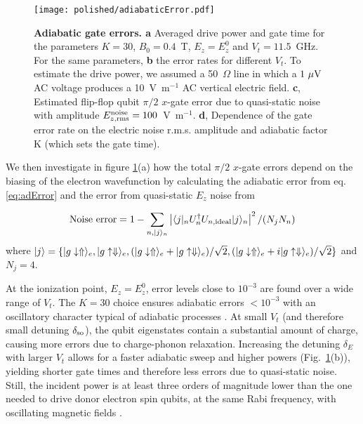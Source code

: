\begin{figure}[h]
	\centering
	\texttt{[image: polished/adiabaticError.pdf]}
	\caption[Adiabatic gate errors]{\textbf{Adiabatic gate errors. a} Averaged drive power and gate time for the parameters $K=30$, $B_0=0.4$~T, $E_z=E_z^0$ and $V_t=11.5$~GHz. For the same parameters, \textbf{b} the error rates for different $V_t$. To estimate the drive power, we assumed a 50~$\Omega$ line in which a $1~{\rm \mu V}$ AC voltage produces a 10~V~m$^{-1}$ AC vertical electric field.
		\textbf{c}, Estimated flip-flop qubit $\pi/2$ $x$-gate error due to quasi-static noise with amplitude $E_{z, \rm rms}^{\rm noise}=100$~V~m$^{-1}$.
		\textbf{d}, Dependence of the gate error rate on the electric noise r.m.s. amplitude and adiabatic factor K (which sets the gate time).}
	\label{fig:adError}
\end{figure}

We then investigate in figure \ref{fig:adError}(a) how the total $\pi/2$ $x$-gate errors depend on the biasing of the electron wavefunction by calculating the adiabatic error from eq. \eqref{eq:adError} and the error from quasi-static $E_z$ noise from
 
\begin{equation}\label{eq:noiseError}
{\rm Noise~error}=1-\sum\limits_{n,|j\rangle_n}{\left|\langle j|_nU_n^\dagger U_{n,\rm ideal}|j\rangle_n\right|^2/(N_jN_n)}
\end{equation}
where $|j\rangle=\{|g\downarrow\Uparrow\rangle_e,|g\uparrow\Downarrow\rangle_e,(|g\downarrow\Uparrow\rangle_e+|g\uparrow\Downarrow\rangle_e)/\sqrt{2},(|g\downarrow\Uparrow\rangle_e+i|g\uparrow\Downarrow\rangle_e)/\sqrt{2}\}$ and $N_j=4$. 


 At the ionization point, $E_z=E_z^0$, error levels close to $10^{-3}$ are found over a wide range of $V_t$. The $K=30$ choice ensures adiabatic errors $<10^{-3}$ with an oscillatory character typical of adiabatic processes \cite{Oh2013}. At small $V_t$ (and therefore small detuning $\delta_{\rm so}$), the qubit eigenstates contain a substantial amount of charge, causing more errors due to charge-phonon relaxation. Increasing the detuning $\delta_E$ with larger $V_t$ allows for a faster adiabatic sweep and higher powers (Fig.~\ref{fig:adError}(b)), yielding shorter gate times and therefore less errors due to quasi-static noise. Still, the incident power is at least three orders of magnitude lower than the one needed to drive donor electron spin qubits, at the same Rabi frequency, with oscillating magnetic fields \cite{Pla2012,Muhonen2014}.

